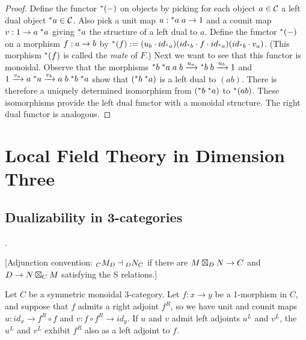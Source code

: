 \documentclass{amsart}
\begin{document}
\begin{proof}
Define the functor ${}^*{(-)}$ on objects by picking for each object $a \in \mathcal C$ a left dual object ${}^*{a} \in \mathcal C$.  Also pick a unit map $u: {}^*{a} \; a \rightarrow 1$ and a counit map $v: 1 \rightarrow a \; {}^*{a}$ giving ${}^*{a}$ the structure of a left dual to $a$.  Define the functor ${}^*{(-)}$ on a morphism $f: a \rightarrow b$ by ${}^*{(f)} := (u_b \cdot id_{{}^*{a}}) (id_{{}^*{b}} \cdot f \cdot id_{{}^*{a}}) (id_{{}^*{b}} \cdot v_a)$.  (This morphism ${}^*{(f)}$ is called the \emph{mate} of $F$.)  Next we want to see that this functor is monoidal.  Observe that the morphisms ${}^*{b} \; {}^*{a} \; a \; b \xrightarrow{u_a} {}^*{b} \; b \xrightarrow{u_b} 1$ and $1 \xrightarrow{v_a} a \; {}^*{a} \xrightarrow{v_b} a \; b \; {}^*{b} \; {}^*{a}$ show that $({}^*{b} \; {}^*{a})$ is a left dual to $(a b)$.  There is therefore a uniquely determined isomorphism from $({}^*{b} \; {}^*{a})$ to ${}^*{(a b)}$.  These isomorphisms provide the left dual functor with a monoidal structure.  The right dual functor is analogous.  %
\end{proof}


\section{Local Field Theory in Dimension Three} \label{sec-lft}

\subsection{Dualizability in 3-categories} \label{sec-lft-dual}
.

[Adjunction convention: ${}_{C} {M}_{D} \dashv  {}_{D} {N}_{C}$ if there are $M \boxtimes_D N \rightarrow C$ and $D \rightarrow N \boxtimes_C M$ satisfying the S relations.] 




\begin{proposition}
	Let $C$ be a symmetric monoidal 3-category. Let $f: x \to y$ be a 1-morphism in $C$, and suppose that $f$ admits a right adjoint $f^R$,  so we have unit and counit maps $u:id_x \to f^R \circ f$ and $v:f \circ f^R \to id_y$. If $u$ and $v$ admit left adjoints $u^L$ and $v^L$, the $u^L$ and $v^L$ exhibit $f^R$ also as a left adjoint to $f$. 
\end{proposition}
\end{document}
